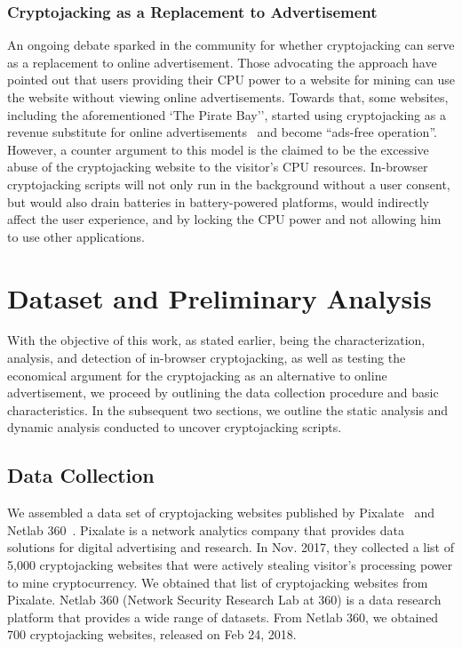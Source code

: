 \documentclass[acmlarge]{acmart}
\newcommand{\cj}{cryptojacking\xspace}
\begin{document}
\subsubsection{Cryptojacking as a Replacement to Advertisement} \label{sec:adcj}
An ongoing debate sparked in the community for whether \cj can serve as a replacement to online advertisement. Those advocating the approach have pointed out that users providing their CPU power to a website for mining can use the website without viewing online advertisements. Towards that, some websites, including the aforementioned `The Pirate Bay'', started using \cj as a revenue substitute for online advertisements~\cite{Shaikh_17,Ernesto_17,Jones_2017} and become ``ads-free operation''. However, a counter argument to this model is the claimed to be the excessive abuse of the \cj website to the visitor's CPU resources. In-browser \cj scripts will not only run in the background without a user consent, but would also drain batteries in battery-powered platforms, would indirectly affect the user experience, and by locking the CPU power and not allowing him to use other applications. 

\section{Dataset and Preliminary Analysis}\label{sec:prelim}
With the objective of this work, as stated earlier, being the characterization, analysis, and detection of in-browser \cj, as well as testing the economical argument for the \cj as an alternative to online advertisement, we proceed by outlining the data collection procedure and basic characteristics. In the subsequent two sections, we outline the static analysis and dynamic analysis conducted to uncover \cj scripts. 

\subsection{Data Collection} \label{sec:data}
We assembled a data set of \cj websites published by  Pixalate~\cite{Loechner17} and Netlab 360~\cite{Netlab360}. Pixalate is a network analytics company that provides data solutions for digital advertising and research. In Nov. 2017, they collected
a list of 5,000 cryptojacking websites that were actively stealing visitor’s processing power to mine cryptocurrency. We obtained that list of cryptojacking websites from Pixalate. Netlab 360 (Network Security Research Lab at 360) is a data research platform that provides a wide range of datasets. From Netlab 360, we obtained  700 \cj websites, released on Feb 24, 2018. 
\end{document}
